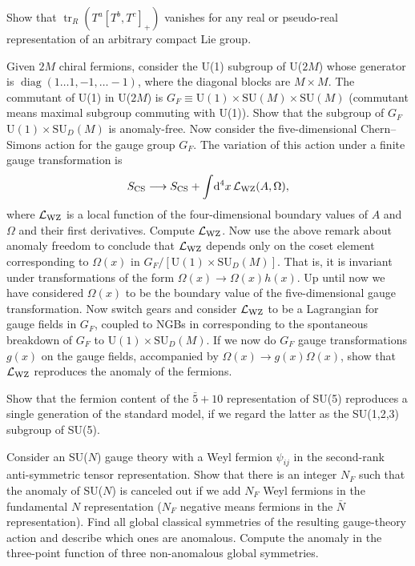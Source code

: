 \begin{banksproblems}
Show that $\operatorname{tr}_R(T^a[T^b,T^c]_+)$ vanishes for any real or
pseudo-real representation of an arbitrary compact Lie group.

Given $2M$ chiral fermions, consider the U(1) subgroup of U($2M$) whose
generator is $\operatorname{diag}(1\ldots1,-1,\ldots-1)$, where the diagonal
blocks are $M\times M$. The commutant of U(1) in U($2M$) is
$G_F\equiv\mathrm{U}(1)\times\mathrm{SU}(M)\times\mathrm{SU}(M)$ (commutant means
maximal subgroup commuting with U(1)). Show that the subgroup of $G_F$
$\mathrm{U}(1)\times\mathrm{SU}_D(M)$ is anomaly-free. Now consider the
five-dimensional Chern--Simons action for the gauge group $G_F$. The
variation of this action under a finite gauge transformation is
\[
  S_{\rm CS}\longrightarrow S_{\rm CS}
  +\int\!\mathop{}\!\mathrm{d}^4x\,\mathcal L_{\rm WZ}(A,\Omega),
\]
where $\mathcal L_{\rm WZ}$ is a local function of the four-dimensional
boundary values of $A$ and $\Omega$ and their first derivatives. Compute
$\mathcal L_{\rm WZ}$. Now use the above remark about anomaly freedom to
conclude that $\mathcal L_{\rm WZ}$ depends only on the coset element
corresponding to $\Omega(x)$ in
$G_F/[\mathrm{U}(1)\times\mathrm{SU}_D(M)]$. That is, it is invariant under
transformations of the form $\Omega(x)\to\Omega(x)h(x)$. Up until now we have
considered $\Omega(x)$ to be the boundary value of the five-dimensional gauge
transformation. Now switch gears and consider $\mathcal L_{\rm WZ}$ to be a
Lagrangian for gauge fields in $G_F$, coupled to NGBs in corresponding to the
spontaneous breakdown of $G_F$ to $\mathrm{U}(1)\times\mathrm{SU}_D(M)$. If we
now do $G_F$ gauge transformations $g(x)$ on the gauge fields, accompanied by
$\Omega(x)\to g(x)\Omega(x)$, show that $\mathcal L_{\rm WZ}$ reproduces the
anomaly of the fermions.

Show that the fermion content of the $\bar5+10$ representation of SU(5)
reproduces a single generation of the standard model, if we regard the latter
as the SU(1,2,3) subgroup of SU(5).

Consider an SU($N$) gauge theory with a Weyl fermion $\psi_{ij}$ in the
second-rank anti-symmetric tensor representation. Show that there is an
integer $N_F$ such that the anomaly of SU($N$) is canceled out if we add
$N_F$ Weyl fermions in the fundamental $N$ representation ($N_F$ negative
means fermions in the $\bar N$ representation). Find all global classical
symmetries of the resulting gauge-theory action and describe which ones are
anomalous. Compute the anomaly in the three-point function of three
non-anomalous global symmetries.


\end{banksproblems}
